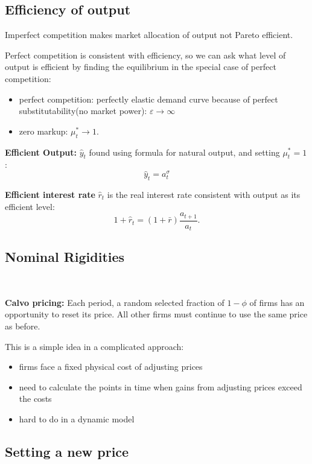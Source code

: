 \subsection{Efficiency of output}

Imperfect competition makes market allocation of output not Pareto efficient.

Perfect competition is consistent with efficiency, so we can ask what level of output is efficient by 
finding the equilibrium in the special case of perfect competition:
\begin{itemize}
    \item perfect competition: perfectly elastic demand curve because of perfect substitutability(no market power): $\varepsilon \to \infty$
    \item zero markup: $\mu_t^* \to 1$.
\end{itemize}

\textbf{Efficient Output:} $\hat{y}_t$ found using formula for natural output, and setting $\mu_t^* = 1$:
\[
\hat{y}_t = a_t^{\sigma}
\]

\textbf{Efficient interest rate} $\hat{r}_t$ is the real interest rate consistent with output as its efficient level:
\[
1 + \hat{r}_t = (1+\bar{r}) \frac{a_{t+1}}{a_t}.
\]

\subsection{Nominal Rigidities}

\begin{assumption}
    \ 

    \textbf{Calvo pricing:} Each period, a random selected fraction of $1-\phi$ of firms has an opportunity to reset its price.
    All other firms must continue to use the same price as before.

    This is a simple idea in a complicated approach:
    \begin{itemize}
        \item firms face a fixed physical cost of adjusting prices
        \item need to calculate the points in time when gains from adjusting prices exceed the costs
        \item hard to do in a dynamic model
    \end{itemize}
\end{assumption}

\subsection{Setting a new price}

